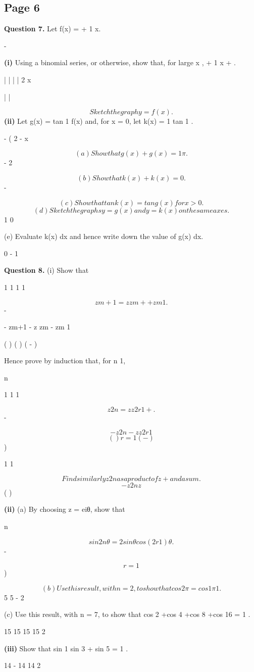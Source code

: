 \documentclass[12pt]{article}
\begin{document}
\subsection*{Page 6}
\begin{flushleft}
\bigskip\textbf{Question 7.} Let f(x) =  + 1 x.\par
-\par
\textbf{(i)} Using a binomial series, or otherwise, show that, for large x ,  + 1 x + .\par
| | \approx | | 2 x\par
| |\par
\[Sketch the graph y = f(x).\]
\textbf{(ii)} Let g(x) = tan 1 f(x) and, for x = 0, let k(x) = 1 tan 1 .\par
- ( 2 - x\par
\[(a) Show that g(x) + g( x) = 1 \pi.\]
- 2\par
\[(b) Show that k(x) + k( x) = 0.\]
-\par
\[(c) Show that tan k(x) = tan g(x) for x > 0.\]
\[(d) Sketch the graphs y = g(x) and y = k(x) on the same axes.\]
1 0\par
(e) Evaluate k(x) dx and hence write down the value of g(x) dx.\par
0 - 1\par
\bigskip\textbf{Question 8.} (i) Show that\par
1 1 1 1\par
\[zm+1 = z zm + + zm 1 .\]
-\par
- zm+1 - z zm - zm 1\par
( ) ( ) ( - )\par
Hence prove by induction that, for n  1,\par
n\par
1 1 1\par
\[z2n = z z2r 1 + .\]
-\par
\[- z2n - z z2r 1\]
\[( ) r=1 ( - )\]
)\par
1 1\par
\[Find similarly z2n as a product of z + and a sum.\]
\[- z2n z\]
( )\par
\textbf{(ii)} (a) By choosing z = eiθ, show that\par
n\par
\[sin 2nθ = 2 sin θ cos(2r 1)θ .\]
-\par
\[r=1\]
)\par
\[(b) Use this result, with n = 2, to show that cos 2 \pi = cos 1 \pi 1 .\]
5 5 - 2\par
(c) Use this result, with n = 7, to show that cos 2 \pi+cos 4 \pi+cos 8 \pi+cos 16 \pi = 1 .\par
15 15 15 15 2\par
\textbf{(iii)} Show that sin 1 \pi sin 3 \pi + sin 5 \pi = 1 .\par
14 - 14 14 2\par
\end{flushleft}
\end{document}
